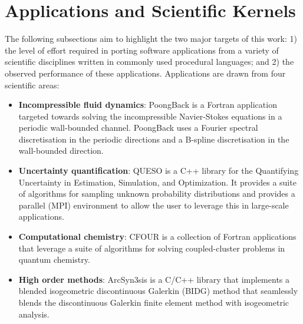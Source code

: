 \section{Applications and Scientific Kernels}
\label{sec:apps}

The following subsections aim to highlight the two major targets of this work: 1) the level of effort
required in porting software applications from a variety of scientific
disciplines written in commonly used procedural languages; and 2) the observed
performance of these applications.  Applications are drawn from four 
scientific areas:
\begin{itemize}
\item {\bf Incompressible fluid dynamics}:  PoongBack is a Fortran application
targeted towards solving the incompressible Navier-Stokes equations in a
periodic wall-bounded channel.  PoongBack uses a Fourier spectral
discretisation in the periodic directions and a B-spline discretisation in the
wall-bounded direction.

\item {\bf Uncertainty quantification}:  QUESO is a C++ library for the
Quantifying Uncertainty in Estimation, Simulation, and Optimization.  It
provides a suite of algorithms for sampling unknown probability distributions
and provides a parallel (MPI) environment to allow the user to leverage this in
large-scale applications.  %

\item {\bf Computational chemistry}:  CFOUR is a collection of Fortran
applications that leverage a suite of algorithms for solving coupled-cluster
problems in quantum chemistry.

\item {\bf High order methods}:  ArcSyn3sis is a C/C++ library that implements
a blended isogeometric discontinuous Galerkin (BIDG) method that seamlessly
blends the discontinuous Galerkin finite element method with isogeometric analysis.

\end{itemize}

